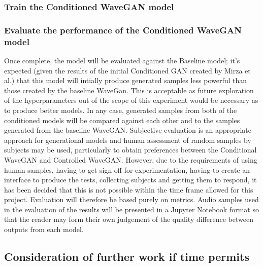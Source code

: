 \documentclass[a4paper, titlepage]{article}
\begin{document}
\subsubsection{Train the Conditioned WaveGAN model}

\subsubsection{Evaluate the performance of the Conditioned WaveGAN model}

Once complete, the model will be evaluated against the Baseline model; it's expected (given the results of the initial Conditioned GAN created by Mirza et al.) that this model will intially produce generated samples less powerful than those created by the baseline WaveGan.
This is acceptable as future exploration of the hyperparameters out of the scope of this experiment would be necessary as to produce better models.
\newline
\newline
In any case, generated samples from both of the conditioned models will be compared against each other and to the samples generated from the baseline WaveGAN.
\newline
\newline
Subjective evaluation is an appropriate approach for generational models and human assessment of random samples by subjects may be used, particularly to obtain preferences between the Conditional WaveGAN and Controlled WaveGAN.
However, due to the requirements of using human samples, having to get sign off for experimentation, having to create an interface to produce the tests, collecting subjects and getting them to respond, it has been decided that this is not possible within the time frame allowed for this project.
Evaluation will therefore be based purely on metrics.
\newline
\newline
Audio samples used in the evaluation of the results will be presented in a Jupyter Notebook format so that the reader may form their own judgement of the quality difference between outputs from each model.

\subsection{Consideration of further work if time permits}
\end{document}
